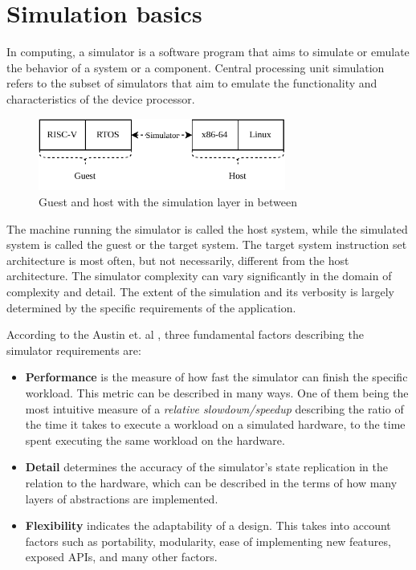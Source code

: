 
\chapter{Simulation basics}

In computing, a simulator is a software program that aims to simulate or emulate the behavior of a system or a component.
Central processing unit simulation refers to the subset of simulators that aim to emulate the functionality and
characteristics of the device processor.

\begin{figure}[h]
	\centering
	\vspace{10px}
	\includegraphics[height=90px]{figures/GuestHostSimulator.pdf}
	\caption{Guest and host with the simulation layer in between}
\end{figure}


The machine running the simulator is called the host system, while the simulated system is called the guest or the target
system. The target system instruction set architecture is most often, but not necessarily, different from the host
architecture. The simulator complexity can vary significantly in the domain of complexity and detail.
The extent of the simulation and its verbosity is largely determined by the specific requirements of the application.

According to the Austin et. al \cite{Simplescalar}, three fundamental factors describing the simulator requirements are:

\begin{itemize}
	\item{\textbf{Performance} is the measure of how fast the simulator can finish the specific workload. This metric
	can be described in many ways. One of them being the most intuitive measure of a \textit{relative slowdown/speedup}
	describing the ratio of the time it takes to execute a workload on a simulated hardware, to the time spent
	executing the same workload on the hardware.}
	\item{\textbf{Detail} determines the accuracy of the simulator's state replication in the relation to the hardware,
	which can be described in the terms of how many layers of abstractions are implemented.}
	\item{\textbf{Flexibility} indicates the adaptability of a design. This takes into account factors such as
	portability, modularity, ease of implementing new features, exposed APIs, and many other factors.}
\end{itemize}

